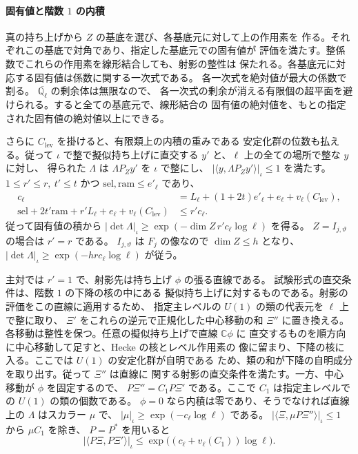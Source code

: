 \paragraph{固有値と階数 \(1\) の内積}
真の持ち上げから \(Z\) の基底を選び、各基底元に対して上の作用素を
作る。それぞれこの基底で対角であり、指定した基底元での固有値が
評価を満たす。整係数でこれらの作用素を線形結合しても、射影の整性は
保たれる。各基底元に対応する固有値は係数に関する一次式である。
各一次式を絶対値が最大の係数で割る。
\(\overline{\mathbb Q_\ell}\) の剰余体は無限なので、
各一次式の剰余が消える有限個の超平面を避けられる。すると全ての基底元で、線形結合の
固有値の絶対値を、もとの指定された固有値の絶対値以上にできる。

さらに \(C_{\mathrm{lev}}\) を掛けると、有限類上の内積の重みである
安定化群の位数も払える。従って \(\iota\) で整で擬似持ち上げに直交する
\(y'\) と、\(\ell\) 上の全ての場所で整な \(y\) に対し、
得られた \(\Lambda\) は
\(\Lambda P_Zy'\) を \(\iota\) で整にし、
\(|\langle y,\Lambda P_Zy'\rangle|_\iota\le1\) を満たす。
\(1\le r'\le r,\ t'\le t\) かつ \(\mathrm{sel},\mathrm{ram}\le e'_\ell\) であり、
\[
 \begin{split}
 c_\ell&=L_\ell+(1+2t)e'_\ell+e_\ell+v_\ell(C_{\mathrm{lev}}),\\
 \mathrm{sel}+2t'\mathrm{ram}+r'L_\ell+e_\ell+v_\ell(C_{\mathrm{lev}})
      &\le r'c_\ell .
 \end{split}
\]
従って固有値の積から
\(|\det\Lambda|_\iota\ge \exp(-\dim Z\,r'c_\ell\log\ell)\)
を得る。
\(Z=I_{j,\vartheta}\) の場合は \(r'=r\) である。
\(I_{j,\vartheta}\) は \(F_j\) の像なので \(\dim Z\le h\) となり、
\(|\det\Lambda|_\iota\ge\exp(-hrc_\ell\log\ell)\) が従う。

主対では \(r'=1\) で、射影先は持ち上げ \(\phi\) の張る直線である。
試験形式の直交条件は、階数 \(1\) の下降の核の中にある
擬似持ち上げに対するものである。射影の評価をこの直線に適用するため、
指定主レベルの \(U(1)\) の類の代表元を \(\ell\) 上で整に取り、
\(\Xi'\) をこれらの逆元で正規化した中心移動の和 \(\Xi''\) に置き換える。
各移動は整性を保つ。任意の擬似持ち上げで直線 \(\mathbb C\phi\) に
直交するものを順方向に中心移動して足すと、Hecke の核とレベル作用素の
像に留まり、下降の核に入る。ここでは \(U(1)\) の安定化群が自明である
ため、類の和が下降の自明成分を取り出す。従って \(\Xi''\) は直線に
関する射影の直交条件を満たす。一方、中心移動が \(\phi\) を固定するので、
\(P\Xi''=C_1 P\Xi'\) である。ここで \(C_1\) は指定主レベルでの
\(U(1)\) の類の個数である。
\(\phi=0\) なら内積は零であり、そうでなければ直線上の
\(\Lambda\) はスカラー \(\mu\) で、
\(|\mu|_\iota\ge\exp(-c_\ell\log\ell)\) である。
\(|\langle\Xi,\mu P\Xi''\rangle|_\iota\le1\) から \(\mu C_1\) を除き、
\(P=P^\ast\) を用いると
\[
 |\langle P\Xi,P\Xi'\rangle|_\iota
    \le\exp\bigl((c_\ell+v_\ell(C_1))\log\ell\bigr).
\]

